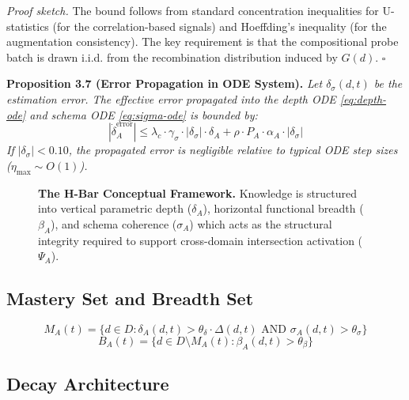 \documentclass[11pt,a4paper]{article}
\begin{document}
\textit{Proof sketch.} The bound follows from standard concentration
inequalities for U-statistics (for the correlation-based signals) and
Hoeffding's inequality (for the augmentation consistency). The key
requirement is that the compositional probe batch is drawn i.i.d. from
the recombination distribution induced by $G(d)$. $\square$

\textbf{Proposition 3.7 (Error Propagation in ODE System).}
\textit{Let $\delta_\sigma(d,t)$ be the estimation error. The effective
error propagated into the depth ODE \eqref{eq:depth-ode} and schema ODE
\eqref{eq:sigma-ode} is bounded by:
\begin{equation}\label{eq:error-propagation}
|\dot{\delta}_A^{\text{error}}| \leq \lambda_c \cdot \gamma_\sigma \cdot |\delta_\sigma| \cdot \delta_A + \rho \cdot P_A \cdot \alpha_A \cdot |\delta_\sigma|
\end{equation}
If $|\delta_\sigma| < 0.10$, the propagated error is negligible relative
to typical ODE step sizes ($\eta_{\max} \sim O(1)$).}

\begin{figure}[htbp]
\centering
\resizebox{0.85\textwidth}{!}{}
\caption{\textbf{The H-Bar Conceptual Framework.} Knowledge is
structured into vertical parametric depth ($\delta_A$), horizontal
functional breadth ($\beta_A$), and schema coherence ($\sigma_A$) which
acts as the structural integrity required to support cross-domain
intersection activation ($\Psi_A$).}
\label{fig:hbar-framework}
\end{figure}

\subsection{Mastery Set and Breadth Set}\label{sec:mastery-set}

\begin{equation}\label{eq:mastery-set}
M_A(t) = \{d \in D : \delta_A(d,t) > \theta_{\delta} \cdot \Delta(d,t) \text{ AND } \sigma_A(d,t) > \theta_{\sigma}\}
\end{equation}
\begin{equation}\label{eq:breadth-set}
B_A(t) = \{d \in D \setminus M_A(t) : \beta_A(d,t) > \theta_{\beta}\}
\end{equation}

\subsection{Decay Architecture}\label{sec:decay}
\end{document}
